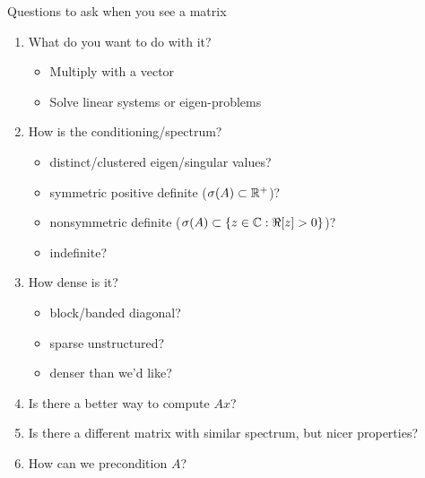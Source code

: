 


\begin{frame}{Questions to ask when you see a matrix}
  \begin{enumerate}
  \item What do you want to do with it?
    \begin{itemize}
    \item Multiply with a vector
    \item Solve linear systems or eigen-problems
    \end{itemize}
  \item How is the conditioning/spectrum?
    \begin{itemize}
    \item distinct/clustered eigen/singular values?
    \item symmetric positive definite ($\sigma(A) \subset \mathbb{R}^+$)?
    \item nonsymmetric definite ($\sigma(A) \subset \{z \in \mathbb{C} : \Re [z] > 0 \}$)?
    \item indefinite?
    \end{itemize}
  \item How dense is it?
    \begin{itemize}
    \item block/banded diagonal?
    \item sparse unstructured?
    \item denser than we'd like?
    \end{itemize}
  \item Is there a better way to compute $Ax$?
  \item Is there a different matrix with similar spectrum, but nicer properties?
  \item \alert<2>{How can we precondition $A$?}
  \end{enumerate}
\end{frame}

